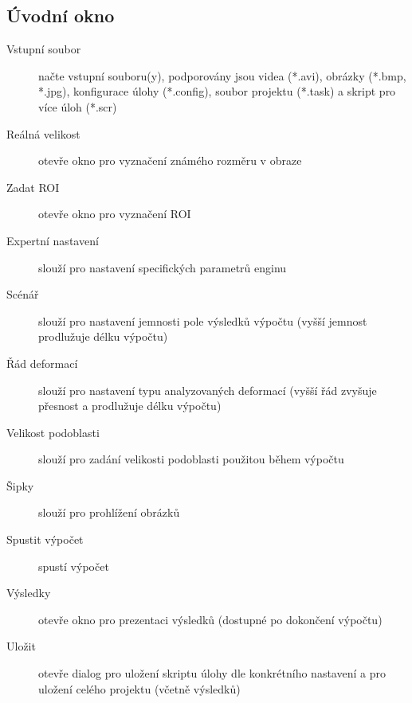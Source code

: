 \documentclass[a4paper,12pt]{article}
\begin{document}
\subsection{Úvodní okno}
\begin{figure}[H]
\end{figure}
\begin{description}
\item[Vstupní soubor] načte vstupní souboru(y), podporovány jsou videa (*.avi), obrázky (*.bmp, *.jpg), konfigurace úlohy (*.config), soubor projektu (*.task) a skript pro více úloh (*.scr)
\item[Reálná velikost] otevře okno pro vyznačení známého rozměru v obraze
\item[Zadat ROI] otevře okno pro vyznačení ROI
\item[Expertní nastavení] slouží pro nastavení specifických parametrů enginu
\item[Scénář] slouží pro nastavení jemnosti pole výsledků výpočtu (vyšší jemnost prodlužuje délku výpočtu)
\item[Řád deformací] slouží pro nastavení typu analyzovaných deformací (vyšší řád zvyšuje přesnost a prodlužuje délku výpočtu)
\item[Velikost podoblasti] slouží pro zadání velikosti podoblasti použitou během výpočtu
\item[Šipky] slouží pro prohlížení obrázků
\item[Spustit výpočet] spustí výpočet
\item[Výsledky] otevře okno pro prezentaci výsledků (dostupné po dokončení výpočtu)
\item[Uložit] otevře dialog pro uložení skriptu úlohy dle konkrétního nastavení a pro uložení celého projektu (včetně výsledků)        
\end{description}
\newpage
\end{document}
